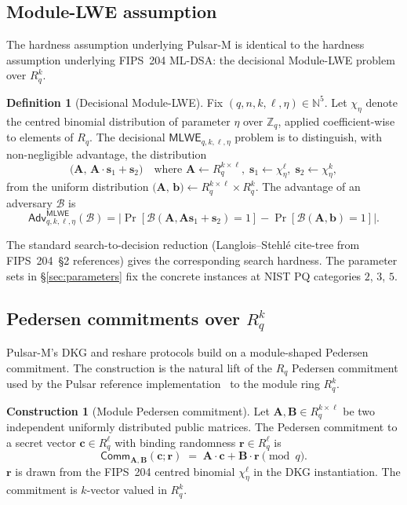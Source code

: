 \documentclass[11pt,a4paper]{article}
\theoremstyle{definition}
\newtheorem{definition}{Definition}
\newtheorem{construction}{Construction}
\theoremstyle{remark}
\newcommand{\Rq}{R_q}
\newcommand{\Zq}{\mathbb{Z}_q}
\newcommand{\Adv}{\mathsf{Adv}}
\newcommand{\MLWE}{\mathsf{MLWE}}
\newcommand{\Comm}{\mathsf{Comm}}
\begin{document}
\subsection{Module-LWE assumption}
\label{sec:prelim-mlwe}

The hardness assumption underlying Pulsar-M is identical to the
hardness assumption underlying FIPS~204 ML-DSA: the decisional
Module-LWE problem over $\Rq^k$.

\begin{definition}[Decisional Module-LWE]
\label{def:mlwe}
Fix $(q, n, k, \ell, \eta) \in \mathbb{N}^5$. Let $\chi_\eta$ denote the
centred binomial distribution of parameter $\eta$ over $\Zq$, applied
coefficient-wise to elements of $\Rq$. The decisional
$\MLWE_{q, k, \ell, \eta}$ problem is to distinguish, with
non-negligible advantage, the distribution
\[
\bigl(\mathbf{A},\,\mathbf{A} \cdot \mathbf{s}_1 + \mathbf{s}_2\bigr)
\quad \text{where } \mathbf{A} \gets \Rq^{k \times \ell},\;
\mathbf{s}_1 \gets \chi_\eta^\ell,\;
\mathbf{s}_2 \gets \chi_\eta^k,
\]
from the uniform distribution
$\bigl(\mathbf{A},\,\mathbf{b}\bigr) \gets \Rq^{k \times \ell} \times \Rq^k$.
The advantage of an adversary $\mathcal{B}$ is
\[
\Adv^{\MLWE}_{q, k, \ell, \eta}(\mathcal{B})
=
\bigl|\Pr[\mathcal{B}(\mathbf{A}, \mathbf{A}\mathbf{s}_1+\mathbf{s}_2) = 1]
- \Pr[\mathcal{B}(\mathbf{A}, \mathbf{b}) = 1]\bigr|.
\]
\end{definition}

The standard search-to-decision reduction (Langlois--Stehl\'e
\cite{lattice-estimator} cite-tree from FIPS~204~\S2 references) gives
the corresponding search hardness. The parameter sets in
\S\ref{sec:parameters} fix the concrete instances at NIST PQ
categories $2$, $3$, $5$.

\subsection{Pedersen commitments over $\Rq^k$}
\label{sec:prelim-pedersen}

Pulsar-M's DKG and reshare protocols build on a module-shaped
Pedersen commitment. The construction is the natural lift of the
$\Rq$ Pedersen commitment used by the Pulsar reference
implementation~\cite{boschini2024corona} to the module
ring $\Rq^k$.

\begin{construction}[Module Pedersen commitment]
\label{con:pedersen}
Let $\mathbf{A}, \mathbf{B} \in \Rq^{k \times \ell}$ be two independent
uniformly distributed public matrices. The Pedersen commitment to a
secret vector $\mathbf{c} \in \Rq^\ell$ with binding randomness
$\mathbf{r} \in \Rq^\ell$ is
\[
\Comm_{\mathbf{A}, \mathbf{B}}(\mathbf{c}; \mathbf{r}) \;=\;
\mathbf{A} \cdot \mathbf{c} + \mathbf{B} \cdot \mathbf{r} \pmod q.
\]
$\mathbf{r}$ is drawn from the FIPS~204 centred binomial $\chi_\eta^\ell$ in
the DKG instantiation. The commitment is $k$-vector valued in
$\Rq^k$.
\end{construction}
\end{document}
